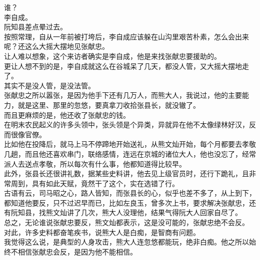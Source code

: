 \begin{multicols}{\theparacolNo}
谁？\\

李自成。\\

阮知县差点晕过去。\\

按照常理，自从一年前被打垮后，李自成应该躲在山沟里艰苦朴素，怎么会出来呢？还这么大摇大摆地见张献忠。\\

让人难以想象，这个来访者确实是李自成，他是来找张献忠要援助的。\\

更让人想不到的是，李自成就这么在谷城呆了几天，都没人管，又大摇大摆地走了。\\

其实不是没人管，是没法管。\\

张献忠之所以嚣张，是因为他手下还有几万人，而熊大人，我说过，他的主要能力，就是这里、那里的忽悠，要真拿刀收拾张县长，就没辙了。\\

而且更麻烦的是，他还收了张献忠的钱。\\

在明末农民起义的许多头领中，张头领是个异类，异就异在他不太像绿林好汉，反而很像官僚。\\

比如他在投降后，就马上马不停蹄地开始送礼，从熊文灿开始，每个月都要去孝敬几趟，而且他还喜欢串门，联络感情，连远在京城的诸位大人，他也没忘了，经常派人去送点孝敬，所以每次有什么事，他都知道得比较早。\\

此外，张县长还很讲礼数，据某些史料讲，他去见上级官员时，还行下跪礼，且非常周到，具有如此天赋，竟然干了这个，实在选错了行。\\

古语有云，司马昭之心，路人皆知，而张县长的心，似乎也差不多了，从上到下，都知道他要反，只不过迟早而已，比如左良玉，曾多次上书，要求解决张献忠，还有阮知县，找熊文灿讲了几次，熊大人没理他，结果气得阮大人回家自尽了。\\

总之，无论谁说张献忠要反，熊文灿都表示，这是没可能的，张献忠绝不会反。\\

对此，许多史料都奋笔疾书，说熊大人是白痴，是智商有问题。\\

我觉得这么说，是典型的人身攻击，熊大人连忽悠都能玩，绝非白痴。他之所以始终不相信张献忠会反，是因为他不能相信。\\


\end{multicols}
